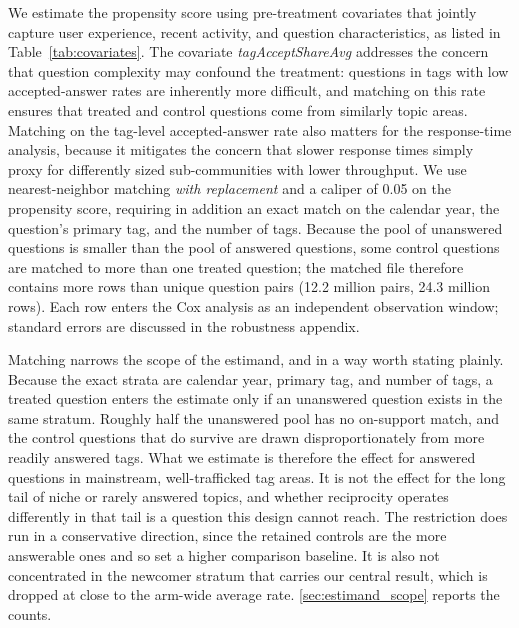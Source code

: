 We estimate the propensity score using pre-treatment covariates that jointly capture user experience, recent activity, and question characteristics, as listed in Table~\ref{tab:covariates}. The covariate \textit{tagAcceptShareAvg} addresses the concern that question complexity may confound the treatment: questions in tags with low accepted-answer rates are inherently more difficult, and matching on this rate ensures that treated and control questions come from similarly  topic areas.
Matching on the tag-level accepted-answer rate also matters for the response-time analysis, because it mitigates the concern that slower response times simply proxy for differently sized sub-communities with lower throughput. We use nearest-neighbor matching \emph{with replacement} and a caliper of 0.05 on the propensity score, requiring in addition an exact match on the calendar year, the question's primary tag, and the number of tags. Because the pool of unanswered questions is smaller than the pool of answered questions, some control questions are matched to more than one treated question; the matched file therefore contains more rows than unique question pairs (12.2 million pairs, 24.3 million rows). Each row enters the Cox analysis as an independent observation window; standard errors are discussed in the robustness appendix.

Matching narrows the scope of the estimand, and in a way worth stating plainly. Because the exact strata are calendar year, primary tag, and number of tags, a treated question enters the estimate only if an unanswered question exists in the same stratum. Roughly half the unanswered pool has no on-support match, and the control questions that do survive are drawn disproportionately from more readily answered tags. What we estimate is therefore the effect for answered questions in mainstream, well-trafficked tag areas. It is not the effect for the long tail of niche or rarely answered topics, and whether reciprocity operates differently in that tail is a question this design cannot reach. The restriction does run in a conservative direction, since the retained controls are the more answerable ones and so set a higher comparison baseline. It is also not concentrated in the newcomer stratum that carries our central result, which is dropped at close to the arm-wide average rate. \ref{sec:estimand_scope} reports the counts.

